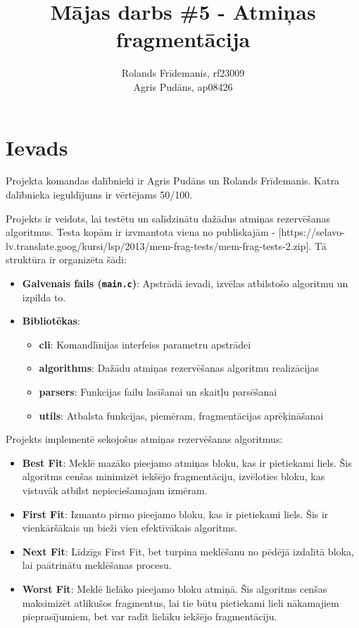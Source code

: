 \documentclass{report}
\title{Mājas darbs \#5 - Atmiņas fragmentācija}
\author{Rolands Frīdemanis, rf23009 \\ Agris Pudāns, ap08426}
\date{}
\begin{document}
	
	\maketitle
	
	\tableofcontents
	
	\section{Ievads}
	
	Projekta komandas dalībnieki ir Agris Pudāns un Rolands Frīdemanis. Katra dalībnieka ieguldījums ir vērtējams 50/100.
	
	Projekts ir veidots, lai testētu un salīdzinātu dažādus atmiņas rezervēšanas algoritmus. Testa kopām ir izvmantota viena no publiskajām - [https://selavo-lv.translate.goog/kursi/lsp/2013/mem-frag-tests/mem-frag-tests-2.zip]. Tā struktūra ir organizēta šādi:
	
	\begin{itemize}
		\item \textbf{Galvenais fails (\texttt{main.c})}: Apstrādā ievadi, izvēlas atbilstošo algoritmu un izpilda to.
		\item \textbf{Bibliotēkas}:
		\begin{itemize}
			\item \textbf{cli}: Komandlīnijas interfeiss parametru apstrādei
			\item \textbf{algorithms}: Dažādu atmiņas rezervēšanas algoritmu realizācijas
			\item \textbf{parsers}: Funkcijas failu lasīšanai un skaitļu parsēšanai
			\item \textbf{utils}: Atbalsta funkcijas, piemēram, fragmentācijas aprēķināšanai
		\end{itemize}
	\end{itemize}
	
	Projekts implementē sekojošus atmiņas rezervēšanas algoritmus:
	\begin{itemize}
		\item \textbf{Best Fit}: Meklē mazāko pieejamo atmiņas bloku, kas ir pietiekami liels. Šis algoritms cenšas minimizēt iekšējo fragmentāciju, izvēloties bloku, kas vistuvāk atbilst nepieciešamajam izmēram.
		\item \textbf{First Fit}: Izmanto pirmo pieejamo bloku, kas ir pietiekami liels. Šis ir vienkāršākais un bieži vien efektīvākais algoritms.
		\item \textbf{Next Fit}: Līdzīgs First Fit, bet turpina meklēšanu no pēdējā izdalītā bloka, lai paātrinātu meklēšanas procesu.
		\item \textbf{Worst Fit}: Meklē lielāko pieejamo bloku atmiņā. Šis algoritms cenšas maksimizēt atlikušos fragmentus, lai tie būtu pietiekami lieli nākamajiem pieprasījumiem, bet var radīt lielāku iekšējo fragmentāciju.
	\end{itemize}
	
\end{document}
